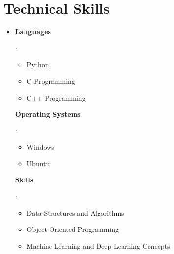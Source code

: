 \documentclass[a4paper,11pt]{article}
\begin{document}
\section{\textbf{Technical Skills}}
\vspace{1mm}
\begin{itemize}[leftmargin=0.05in, label={}]
    \small
    \item{
        \parbox[t]{0.4\textwidth}{
            \textbf{Languages}{: 
            \begin{itemize}[label=\textasteriskcentered]
                \item Python
                \item C Programming
                \item C++ Programming
            \end{itemize}
            }
             \textbf{Operating Systems}{: 
            \begin{itemize}[label=\textasteriskcentered]
                \item Windows
                \item Ubuntu
            \end{itemize}
            }
        }
        \parbox[t]{0.55\textwidth}{
            \textbf{Skills}{:
                \begin{itemize}[label=\textasteriskcentered]
                    \item Data Structures and Algorithms
                    \item Object-Oriented Programming
                    \item Machine Learning and Deep Learning Concepts
                \end{itemize}
            }
        }
        }
    
\end{itemize}


\end{document}
